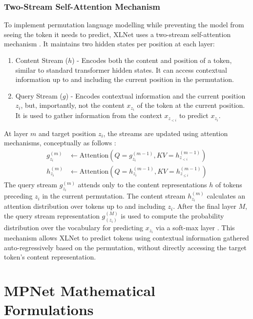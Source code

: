\documentclass[10pt,oneside]{report}
\begin{document}
\subsubsection*{Two-Stream Self-Attention Mechanism}
To implement permutation language modelling while preventing the model from seeing the token it needs to predict, XLNet uses a two-stream self-attention mechanism \cite{vaswani2017attention, yang2019xlnet}. It maintains two hidden states per position at each layer:
\begin{enumerate}
    \item Content Stream ($h$) - Encodes both the content and position of a token, similar to standard transformer hidden states. It can access contextual information up to and including the current position in the permutation.
    \item Query Stream ($g$) - Encodes contextual information and the current position $z_i$, but, importantly, not the content $x_{z_i}$ of the token at the current position. It is used to gather information from the context $x_{z_{<i}}$ to predict $x_{z_i}$.
\end{enumerate}
At layer $m$ and target position $z_i$, the streams are updated using attention mechanisms, conceptually as follows \cite{vaswani2017attention, yang2019xlnet}:
\begin{align}
    g_{z_i}^{(m)} &\leftarrow \text{Attention} (Q = g_{z_i}^{(m - 1)}, KV = h_{z_{<i}}^{(m - 1)}) \label{eq:xlnet_g_update_appendix} \\ %
    h_{z_i}^{(m)} &\leftarrow \text{Attention} (Q = h_{z_i}^{(m - 1)}, KV = h_{z_{\le i}}^{(m - 1)}) \label{eq:xlnet_h_update_appendix} %
\end{align}
The query stream $g_{z_i}^{(m)}$ attends only to the content representations $h$ of tokens preceding $z_i$ in the current permutation. The content stream $h_{z_i}^{(m)}$ calculates an attention distribution over tokens up to and including $z_i$. After the final layer $M$, the query stream representation $g_{(z_i)}^{(M)}$ is used to compute the probability distribution over the vocabulary for predicting $x_{z_i}$ via a soft-max layer \cite{gao2017properties, yang2019xlnet}. This mechanism allows XLNet to predict tokens using contextual information gathered auto-regressively based on the permutation, without directly accessing the target token's content representation.

\section{MPNet Mathematical Formulations} \label{app:mpnet_maths}
\end{document}
